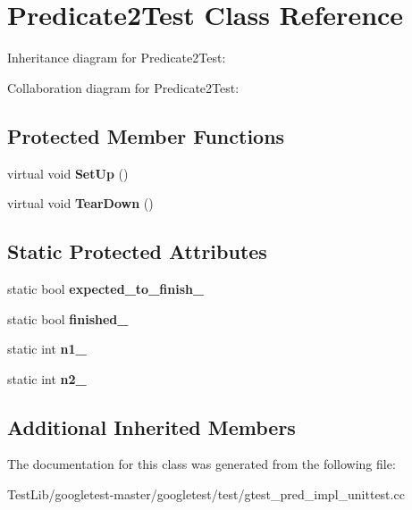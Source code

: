 \hypertarget{classPredicate2Test}{}\section{Predicate2\+Test Class Reference}
\label{classPredicate2Test}


Inheritance diagram for Predicate2\+Test\+:


Collaboration diagram for Predicate2\+Test\+:
\subsection*{Protected Member Functions}
\begin{DoxyCompactItemize}
\item 
\mbox{\label{classPredicate2Test_a9778563daf4846327d32061c1a8ccba0}} 
virtual void {\bfseries Set\+Up} ()
\item 
\mbox{\label{classPredicate2Test_a7379f8f7772af6b4c76edcc90b6aaaeb}} 
virtual void {\bfseries Tear\+Down} ()
\end{DoxyCompactItemize}
\subsection*{Static Protected Attributes}
\begin{DoxyCompactItemize}
\item 
\mbox{\label{classPredicate2Test_a56cf1f0f556addd9a62e0644dc1a86fc}} 
static bool {\bfseries expected\+\_\+to\+\_\+finish\+\_\+}
\item 
\mbox{\label{classPredicate2Test_a30f4ef76d3004253078e767e5c653b85}} 
static bool {\bfseries finished\+\_\+}
\item 
\mbox{\label{classPredicate2Test_ac002d8e279b24e75906fd19973fc2170}} 
static int {\bfseries n1\+\_\+}
\item 
\mbox{\label{classPredicate2Test_a9dbe5173570b9b911af2df889c287027}} 
static int {\bfseries n2\+\_\+}
\end{DoxyCompactItemize}
\subsection*{Additional Inherited Members}


The documentation for this class was generated from the following file\+:\begin{DoxyCompactItemize}
\item 
Test\+Lib/googletest-\/master/googletest/test/gtest\+\_\+pred\+\_\+impl\+\_\+unittest.\+cc\end{DoxyCompactItemize}
